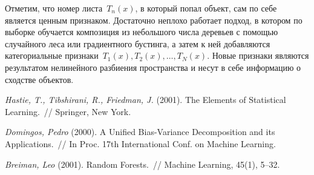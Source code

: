 \documentclass[12pt,fleqn]{article}
\begin{document}
Отметим, что номер листа~$T_n(x)$, в который попал объект, сам по себе является ценным признаком.
Достаточно неплохо работает подход, в котором по выборке обучается композиция
из небольшого числа деревьев с помощью случайного леса или градиентного бустинга,
а затем к ней добавляются категориальные признаки~$T_1(x), T_2(x), \dots, T_N(x)$.
Новые признаки являются результатом нелинейного разбиения пространства
и несут в себе информацию о сходстве объектов.

\begin{thebibliography}{1}
    \emph{Hastie, T., Tibshirani, R., Friedman, J.} (2001).
    The Elements of Statistical Learning.~//
    Springer, New York.

    \emph{Domingos, Pedro} (2000).
    A Unified Bias-Variance Decomposition and its Applications.~//
    In Proc. 17th International Conf. on Machine Learning.

    \emph{Breiman, Leo} (2001).
    Random Forests.~//
    Machine Learning, 45(1), 5--32.
\end{thebibliography}
\end{document}

